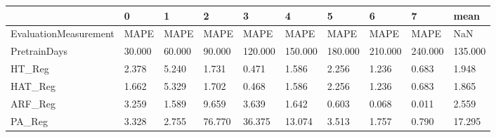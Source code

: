 \begin{tabular}{llllllllll}
\toprule
{} &      0 &      1 &      2 &       3 &       4 &       5 &       6 &       7 &    mean \\
\midrule
EvaluationMeasurement &   MAPE &   MAPE &   MAPE &    MAPE &    MAPE &    MAPE &    MAPE &    MAPE &     NaN \\
PretrainDays          & 30.000 & 60.000 & 90.000 & 120.000 & 150.000 & 180.000 & 210.000 & 240.000 & 135.000 \\
HT\_Reg                &  2.378 &  5.240 &  1.731 &   0.471 &   1.586 &   2.256 &   1.236 &   0.683 &   1.948 \\
HAT\_Reg               &  1.662 &  5.329 &  1.702 &   0.468 &   1.586 &   2.256 &   1.236 &   0.683 &   1.865 \\
ARF\_Reg               &  3.259 &  1.589 &  9.659 &   3.639 &   1.642 &   0.603 &   0.068 &   0.011 &   2.559 \\
PA\_Reg                &  3.328 &  2.755 & 76.770 &  36.375 &  13.074 &   3.513 &   1.757 &   0.790 &  17.295 \\
\bottomrule
\end{tabular}
